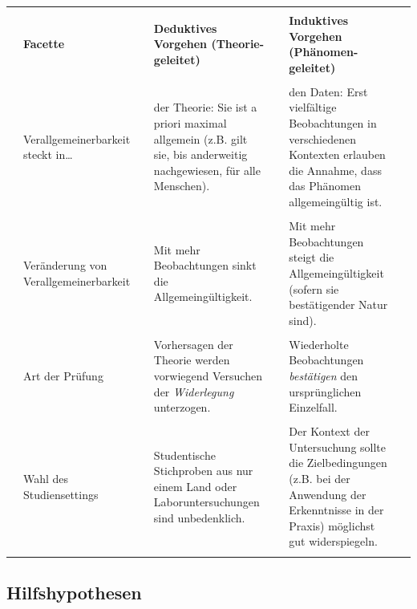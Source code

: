 \documentclass[
  letterpaper,
  DIV=11,
  numbers=noendperiod]{scrreprt}
\begin{document}
\begin{longtable}[]{@{}
  >{\raggedright\arraybackslash}p{}
  >{\raggedright\arraybackslash}p{}
  >{\raggedright\arraybackslash}p{}
  >{\raggedright\arraybackslash}p{}
  >{\raggedright\arraybackslash}p{}
  >{\raggedright\arraybackslash}p{}
  >{\raggedright\arraybackslash}p{}@{}}
\toprule\noalign{}
\endhead
\bottomrule\noalign{}
\endlastfoot
& & & & & & \\
& \textbf{Facette} & & \textbf{Deduktives Vorgehen (Theorie-geleitet)} &
& \textbf{Induktives Vorgehen (Phänomen-geleitet)} & \\
& & & & & & \\
& Verallgemeinerbarkeit steckt in\ldots{} & & der Theorie: Sie ist a
priori maximal allgemein (z.B. gilt sie, bis anderweitig nachgewiesen,
für alle Menschen). & & den Daten: Erst vielfältige Beobachtungen in
verschiedenen Kontexten erlauben die Annahme, dass das Phänomen
allgemeingültig ist. & \\
& & & & & & \\
& Veränderung von Verallgemeinerbarkeit & & Mit mehr Beobachtungen sinkt
die Allgemeingültigkeit. & & Mit mehr Beobachtungen steigt die
Allgemeingültigkeit (sofern sie bestätigender Natur sind). & \\
& & & & & & \\
& Art der Prüfung & & Vorhersagen der Theorie werden vorwiegend
Versuchen der \emph{Widerlegung} unterzogen. & & Wiederholte
Beobachtungen \emph{bestätigen} den ursprünglichen Einzelfall. & \\
& & & & & & \\
& Wahl des Studiensettings & & Studentische Stichproben aus nur einem
Land oder Laboruntersuchungen sind unbedenklich. & & Der Kontext der
Untersuchung sollte die Zielbedingungen (z.B. bei der Anwendung der
Erkenntnisse in der Praxis) möglichst gut widerspiegeln. & \\
& & & & & & \\
\end{longtable}

\subsection{Hilfshypothesen}\label{hilfshypothesen}
\end{document}
